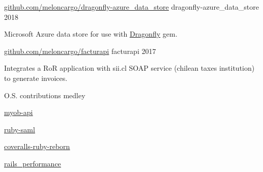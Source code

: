 

\begin{cventries}

  \cventry
    {\href{https://github.com/meloncargo/dragonfly-azure_data_store}{\underline{github.com/meloncargo/dragonfly-azure\_data\_store}}} %
    {dragonfly-azure\_data\_store} %
    {} %
    {2018} %
    {
      \begin{cvitems} %
        \item { Microsoft Azure data store for use with
                \href{http://github.com/markevans/dragonfly}{\underline{Dragonfly}}
                gem. }
      \end{cvitems}
    }

  \cventry
    {\href{https://github.com/meloncargo/facturapi}{\underline{github.com/meloncargo/facturapi}}} %
    {facturapi} %
    {} %
    {2017} %
    {
      \begin{cvitems} %
        \item { Integrates a RoR application with sii.cl SOAP service (chilean
                taxes institution) to generate invoices. }
      \end{cvitems}
    }

  \cventry
    {} %
    {O.S. contributions medley} %
    {} %
    {} %
    {
      \begin{cvitems} %
        \item { \href{https://github.com/visfleet/myob-api/commits?author=alagos}{\underline{myob-api}} }
        \item { \href{https://github.com/SAML-Toolkits/ruby-saml/commits?author=alagos}{\underline{ruby-saml}} }
        \item { \href{https://github.com/tagliala/coveralls-ruby-reborn/commits/main/?author=alagos}{\underline{coveralls-ruby-reborn}} }
        \item { \href{https://github.com/igorkasyanchuk/rails_performance/commits/master/?author=alagos}{\underline{rails\_performance}} }
      \end{cvitems}
    }

\end{cventries}
